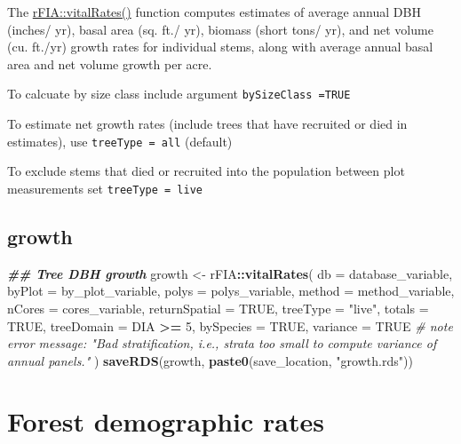\documentclass[
]{book}
\newenvironment{Shaded}{\begin{snugshade}}{\end{snugshade}}
\newcommand{\AttributeTok}[1]{\textcolor[rgb]{0.13,0.29,0.53}{#1}}
\newcommand{\CommentTok}[1]{\textcolor[rgb]{0.56,0.35,0.01}{\textit{#1}}}
\newcommand{\ConstantTok}[1]{\textcolor[rgb]{0.56,0.35,0.01}{#1}}
\newcommand{\DecValTok}[1]{\textcolor[rgb]{0.00,0.00,0.81}{#1}}
\newcommand{\DocumentationTok}[1]{\textcolor[rgb]{0.56,0.35,0.01}{\textbf{\textit{#1}}}}
\newcommand{\FunctionTok}[1]{\textcolor[rgb]{0.13,0.29,0.53}{\textbf{#1}}}
\newcommand{\NormalTok}[1]{#1}
\newcommand{\OtherTok}[1]{\textcolor[rgb]{0.56,0.35,0.01}{#1}}
\newcommand{\SpecialCharTok}[1]{\textcolor[rgb]{0.81,0.36,0.00}{\textbf{#1}}}
\newcommand{\StringTok}[1]{\textcolor[rgb]{0.31,0.60,0.02}{#1}}
\begin{document}
The \href{https://rdrr.io/cran/rFIA/man/vitalRates.html}{rFIA::vitalRates()} function computes estimates of average annual DBH (inches/ yr), basal area (sq. ft./ yr), biomass (short tons/ yr), and net volume (cu. ft./yr) growth rates for individual stems, along with average annual basal area and net volume growth per acre.

To calcuate by size class include argument \texttt{bySizeClass\ =TRUE}

To estimate net growth rates (include trees that have recruited or died in estimates), use \texttt{treeType\ =\ \textquotesingle{}all\textquotesingle{}} (default)

To exclude stems that died or recruited into the population between plot measurements set \texttt{treeType\ =\ \textquotesingle{}live\textquotesingle{}}

\hypertarget{growth}{%
\subsection{growth}\label{growth}}

\begin{Shaded}
\begin{Highlighting}[]
\DocumentationTok{\#\# Tree DBH growth}
\NormalTok{growth }\OtherTok{\textless{}{-}}\NormalTok{ rFIA}\SpecialCharTok{::}\FunctionTok{vitalRates}\NormalTok{(}
  \AttributeTok{db =}\NormalTok{ database\_variable,}
  \AttributeTok{byPlot =}\NormalTok{ by\_plot\_variable,}
  \AttributeTok{polys =}\NormalTok{ polys\_variable,}
  \AttributeTok{method =}\NormalTok{ method\_variable,}
  \AttributeTok{nCores =}\NormalTok{ cores\_variable,}
  \AttributeTok{returnSpatial =} \ConstantTok{TRUE}\NormalTok{,}
  \AttributeTok{treeType =} \StringTok{"live"}\NormalTok{,}
  \AttributeTok{totals =} \ConstantTok{TRUE}\NormalTok{,}
  \AttributeTok{treeDomain =}\NormalTok{ DIA }\SpecialCharTok{\textgreater{}=} \DecValTok{5}\NormalTok{,}
  \AttributeTok{bySpecies =} \ConstantTok{TRUE}\NormalTok{,}
  \AttributeTok{variance =} \ConstantTok{TRUE} \CommentTok{\# note error message: "Bad stratification, i.e., strata too small to compute variance of annual panels." }
\NormalTok{)}
\FunctionTok{saveRDS}\NormalTok{(growth, }\FunctionTok{paste0}\NormalTok{(save\_location, }\StringTok{"growth.rds"}\NormalTok{))}
\end{Highlighting}
\end{Shaded}

\hypertarget{forest-demographic-rates}{%
\section{Forest demographic rates}\label{forest-demographic-rates}}
\end{document}
